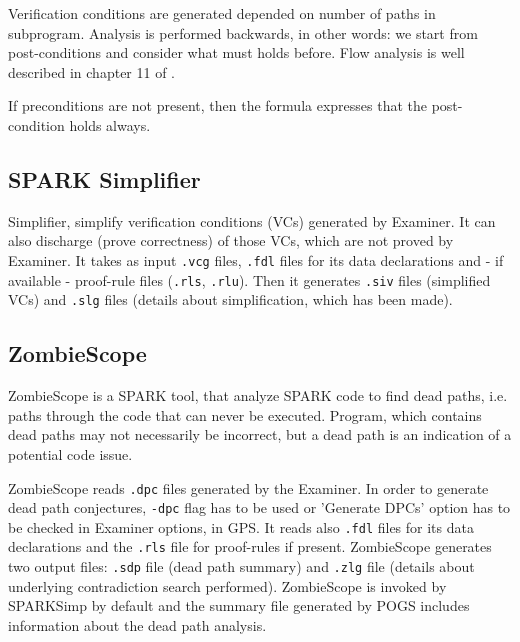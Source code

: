 Verification conditions are generated depended on number of paths in subprogram. Analysis is performed backwards, in other words: we start from post-conditions and consider what must holds before. Flow analysis is well described in chapter 11 of \cite{Barnes:Book}.

If preconditions are not present, then the formula expresses that the post-condition holds always.



\subsection{SPARK Simplifier}
\label{background:sparkverification:simplifier}

Simplifier, simplify verification conditions (VCs) generated by Examiner. It can also discharge (prove correctness) of those VCs, which are not proved by Examiner. \cite{Simplifier:Online} It takes as input \lstinline{.vcg} files, \lstinline{.fdl} files for its data declarations and - if available - proof-rule files (\lstinline{.rls}, \lstinline{.rlu}). Then it generates \lstinline{.siv} files (simplified VCs) and \lstinline{.slg} files (details about simplification, which has been made).



\subsection{ZombieScope}
\label{background:sparkverification:zombiescope}

ZombieScope is a SPARK tool, that analyze SPARK code to find dead paths, i.e. paths through the code that can never be executed. Program, which contains dead paths may not necessarily be incorrect, but a dead path is an indication of a potential code issue.

ZombieScope reads \lstinline{.dpc} files generated by the Examiner. In order to generate dead path conjectures, \lstinline{-dpc} flag has to be used or 'Generate DPCs' option has to be checked in Examiner options, in GPS. It reads also \lstinline{.fdl} files for its data declarations and the \lstinline{.rls} file for proof-rules if present. ZombieScope generates two output files: \lstinline{.sdp} file (dead path summary) and \lstinline{.zlg} file (details about underlying contradiction search performed). ZombieScope is invoked by SPARKSimp by default and the summary file generated by POGS includes information about the dead path analysis.



